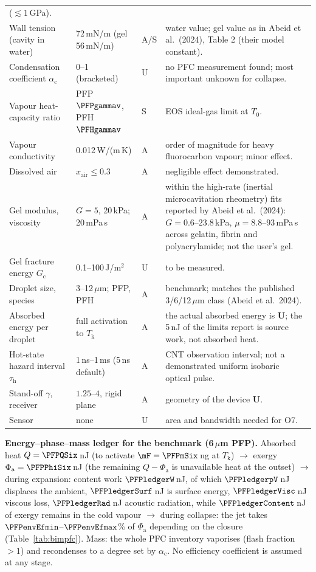 \begin{center}
\begin{longtable}{p{}p{}p{}p{}}
($\lesssim1$\,GPa).\\
Wall tension (cavity in water) & 72\,mN/m (gel 56\,mN/m) & A/S & water value; gel value as in Abeid et al.\ (2024),
Table 2 (their model constant).\\
Condensation coefficient $\alpha_{\mathrm c}$ & 0--1 (bracketed) & U & no PFC measurement found; most important
unknown for collapse.\\
Vapour heat-capacity ratio & PFP $\PFPgammav$, PFH $\PFHgammav$ & S & EOS ideal-gas limit at $T_0$.\\
Vapour conductivity & 0.012\,W/(m\,K) & A & order of magnitude for heavy fluorocarbon vapour; minor effect.\\
Dissolved air & $x_{\mathrm{air}}\le0.3$ & A & negligible effect demonstrated.\\
Gel modulus, viscosity & $G=5$, 20\,kPa; 20\,mPa\,s & A & within the high-rate (inertial microcavitation rheometry)
fits reported by Abeid et al.\ (2024): $G=0.6$--$23.8$\,kPa, $\mu=8.8$--$93$\,mPa\,s across gelatin, fibrin and
polyacrylamide; not the user's gel.\\
Gel fracture energy $G_{\mathrm c}$ & 0.1--100\,J/m$^2$ & U & to be measured.\\
Droplet size, species & 3--12\,$\mu$m; PFP, PFH & A & benchmark; matches the published 3/6/12\,$\mu$m class
(Abeid et al.\ 2024).\\
Absorbed energy per droplet & full activation to $T_{\mathrm k}$ & A & the actual absorbed energy is \textbf{U};
the 5\,nJ of the limits report is source work, not absorbed heat.\\
Hot-state hazard interval $\tau_{\mathrm h}$ & 1\,ns--1\,ms (5\,ns default) & A & CNT observation interval;
not a demonstrated uniform isobaric optical pulse.\\
Stand-off $\gamma$, receiver & $1.25$--$4$, rigid plane & A & geometry of the device \textbf{U}.\\
Sensor & none & U & area and bandwidth needed for O7.\\
\bottomrule
\end{longtable}
\end{center}
\textbf{Energy--phase--mass ledger for the benchmark (6\,$\mu$m PFP).} Absorbed heat $Q=\PFPQSix$\,nJ (to activate
$\mF=\PFPmSix$\,ng at $T_{\mathrm k}$) $\to$ exergy $\Phi_{\mathrm a}=\PFPPhiSix$\,nJ (the remaining
$Q-\Phi_{\mathrm a}$ is unavailable heat at the outset) $\to$ during expansion: content work $\PFPledgerW$\,nJ, of which
$\PFPledgerpV$\,nJ displaces the ambient, $\PFPledgerSurf$\,nJ is surface energy, $\PFPledgerVisc$\,nJ viscous loss,
$\PFPledgerRad$\,nJ acoustic radiation, while $\PFPledgerContent$\,nJ of exergy remains in the cold vapour
$\to$ during collapse: the jet takes $\PFPenvEfmin$--$\PFPenvEfmax$\% of $\Phi_{\mathrm a}$ depending on the closure
(Table~\ref{tab:bimpfc}). Mass: the whole PFC inventory vaporises (flash fraction $>1$) and recondenses to a degree
set by $\alpha_{\mathrm c}$. No efficiency coefficient is assumed at any stage.
